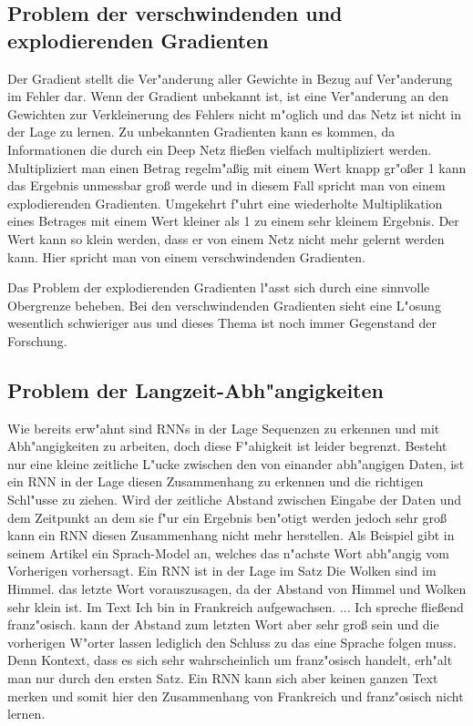 {\subsection{Problem der verschwindenden und explodierenden Gradienten}
Der Gradient stellt die Ver"anderung aller Gewichte in Bezug auf Ver"anderung im Fehler dar. Wenn der Gradient unbekannt ist, ist eine Ver"anderung an den Gewichten zur Verkleinerung des Fehlers nicht m"oglich und das Netz ist nicht in der Lage zu lernen. Zu unbekannten Gradienten kann es kommen, da Informationen die durch ein Deep Netz flie{\ss}en vielfach multipliziert werden. Multipliziert man einen Betrag regelm"a{\ss}ig mit einem Wert knapp gr"o{\ss}er 1 kann das Ergebnis unmessbar gro{\ss} werde und in diesem Fall spricht man von einem explodierenden Gradienten. Umgekehrt f"uhrt eine wiederholte Multiplikation eines Betrages mit einem Wert kleiner als 1 zu einem sehr kleinem Ergebnis. Der Wert kann so klein werden, dass er von einem Netz nicht mehr gelernt werden kann. Hier spricht man von einem verschwindenden Gradienten.

Das Problem der explodierenden Gradienten l"asst sich durch eine sinnvolle Obergrenze beheben. Bei den verschwindenden Gradienten sieht eine L"osung wesentlich schwieriger aus und dieses Thema ist noch immer Gegenstand der Forschung.


\subsection{Problem der Langzeit-Abh"angigkeiten}
Wie bereits erw"ahnt sind RNNs in der Lage Sequenzen zu erkennen und mit Abh"angigkeiten zu arbeiten, doch diese F"ahigkeit ist leider begrenzt. Besteht nur eine kleine zeitliche L"ucke zwischen den von einander abh"angigen Daten, ist ein RNN in der Lage diesen Zusammenhang zu erkennen und die richtigen Schl"usse zu ziehen. Wird der zeitliche Abstand zwischen Eingabe der Daten und dem Zeitpunkt an dem sie f"ur ein Ergebnis ben"otigt werden jedoch sehr gro{\ss} kann ein RNN diesen Zusammenhang nicht mehr herstellen. Als Beispiel gibt \cite{Olah} in seinem Artikel ein Sprach-Model an, welches das n"achste Wort abh"angig vom Vorherigen vorhersagt. Ein RNN ist in der Lage im Satz {\glqq}Die Wolken sind im Himmel.{\grqq} das letzte Wort vorauszusagen, da der Abstand von Himmel und Wolken sehr klein ist. Im Text {\glqq}Ich bin in Frankreich aufgewachsen. ... Ich spreche flie{\ss}end franz"osisch.{\grqq} kann der Abstand zum letzten Wort aber sehr gro{\ss} sein und die vorherigen W"orter lassen lediglich den Schluss zu das eine Sprache folgen muss. Denn Kontext, dass es sich sehr wahrscheinlich um franz"osisch handelt, erh"alt man nur durch den ersten Satz. Ein RNN kann sich aber keinen ganzen Text merken und somit hier den Zusammenhang von Frankreich und franz"osisch nicht lernen.

}
